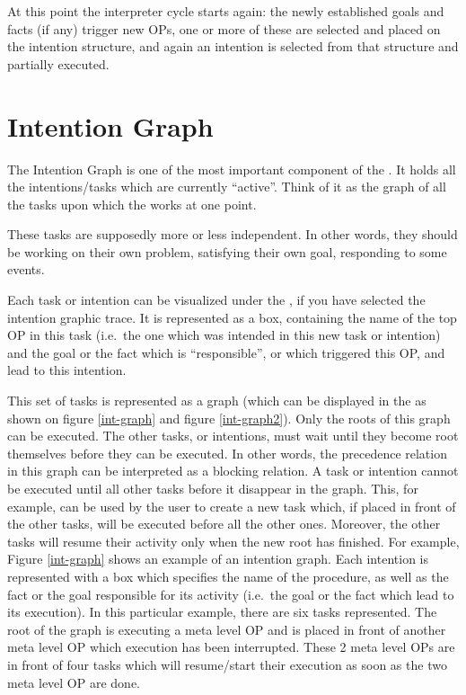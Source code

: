 At this point the interpreter cycle starts again: the newly established
goals and facts (if any) trigger new OPs, one or more of these are
selected and placed on the intention structure, and again an intention is
selected from that structure and partially executed.

\section{Intention Graph}

The Intention Graph is one of the most important component of the \CPK{}.
It holds all the intentions/tasks which are currently ``active''. Think of
it as the graph of all the tasks upon which the \CPK{} works at one point.

These tasks are supposedly more or less independent. In other words, they
should be working on their own problem, satisfying their own goal, responding
to some events.




Each task or intention can be visualized under the \XPK{}, if you have selected
the intention graphic trace. It is represented as a box, containing the name of
the top OP in this task (i.e.\ the one which was intended in this new task or
intention) and the goal or the fact which is ``responsible'', or which
triggered this OP, and lead to this intention.

This set of tasks is represented as a graph (which can be displayed in the
\XOPRS{} as shown on figure \ref{int-graph} and figure \ref{int-graph2}). Only
the roots of this graph can be executed. The other tasks, or intentions, must
wait until they become root themselves before they can be executed. In other
words, the precedence relation in this graph can be interpreted as a blocking
relation. A task or intention cannot be executed until all other tasks before
it disappear in the graph.  This, for example, can be used by the user to
create a new task which, if placed in front of the other tasks, will be
executed before all the other ones.  Moreover, the other tasks will resume
their activity only when the new root has finished. For example, Figure
\ref{int-graph} shows an example of an intention graph. Each intention is
represented with a box which specifies the name of the procedure, as well as
the fact or the goal responsible for its activity (i.e.\ the goal or the fact
which lead to its execution). In this particular example, there are six tasks
represented. The root of the graph is executing a meta level OP and is placed
in front of another meta level OP which execution has been interrupted. These 2
meta level OPs are in front of four tasks which will resume/start their
execution as soon as the two meta level OP are done.

